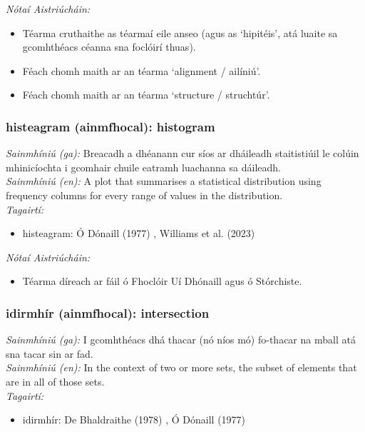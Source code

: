  \noindent \textit{Nótaí Aistriúcháin:}
\begin{itemize}
	\item Téarma cruthaithe as téarmaí eile anseo (agus as `hipitéis', atá luaite sa gcomhthéacs céanna sna foclóirí thuas).
	\item Féach chomh maith ar an téarma `alignment / ailíniú'.
	\item Féach chomh maith ar an téarma `structure / struchtúr'.
\end{itemize}


\subsubsection*{histeagram (ainmfhocal): histogram}
 \noindent \textit{Sainmhíniú (ga):} Breacadh a dhéanann cur síos ar dháileadh staitistiúil le colúin mhinicíochta i gcomhair chuile eatramh luachanna sa dáileadh.
\\
 \noindent \textit{Sainmhíniú (en):} A plot that summarises a statistical distribution using frequency columns for every range of values in the distribution.
\\
 \noindent \textit{Tagairtí:}
\begin{itemize}
	\item histeagram: Ó Dónaill (1977) \cite{odonaill}, Williams et al. (2023) \cite{storchiste}
\end{itemize}

 \noindent \textit{Nótaí Aistriúcháin:}
\begin{itemize}
	\item Téarma díreach ar fáil ó Fhoclóir Uí Dhónaill agus ó Stórchiste.
\end{itemize}


\subsubsection*{idirmhír (ainmfhocal): intersection}
 \noindent \textit{Sainmhíniú (ga):} I gcomhthéacs dhá thacar (nó níos mó) fo-thacar na mball atá sna tacar sin ar fad.
\\
 \noindent \textit{Sainmhíniú (en):} In the context of two or more sets, the subset of elements that are in all of those sets.
\\
 \noindent \textit{Tagairtí:}
\begin{itemize}
	\item idirmhír: De Bhaldraithe (1978) \cite{de-bhaldraithe}, Ó Dónaill (1977) \cite{odonaill}
\end{itemize}

